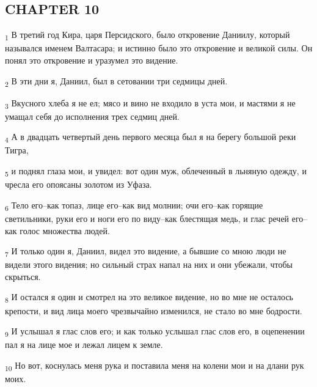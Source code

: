 \subsection{CHAPTER 10}
\begin{tcolorbox}
\textsubscript{1} В третий год Кира, царя Персидского, было откровение Даниилу, который назывался именем Валтасара; и истинно было это откровение и великой силы. Он понял это откровение и уразумел это видение.
\end{tcolorbox}
\begin{tcolorbox}
\textsubscript{2} В эти дни я, Даниил, был в сетовании три седмицы дней.
\end{tcolorbox}
\begin{tcolorbox}
\textsubscript{3} Вкусного хлеба я не ел; мясо и вино не входило в уста мои, и мастями я не умащал себя до исполнения трех седмиц дней.
\end{tcolorbox}
\begin{tcolorbox}
\textsubscript{4} А в двадцать четвертый день первого месяца был я на берегу большой реки Тигра,
\end{tcolorbox}
\begin{tcolorbox}
\textsubscript{5} и поднял глаза мои, и увидел: вот один муж, облеченный в льняную одежду, и чресла его опоясаны золотом из Уфаза.
\end{tcolorbox}
\begin{tcolorbox}
\textsubscript{6} Тело его--как топаз, лице его--как вид молнии; очи его--как горящие светильники, руки его и ноги его по виду--как блестящая медь, и глас речей его--как голос множества людей.
\end{tcolorbox}
\begin{tcolorbox}
\textsubscript{7} И только один я, Даниил, видел это видение, а бывшие со мною люди не видели этого видения; но сильный страх напал на них и они убежали, чтобы скрыться.
\end{tcolorbox}
\begin{tcolorbox}
\textsubscript{8} И остался я один и смотрел на это великое видение, но во мне не осталось крепости, и вид лица моего чрезвычайно изменился, не стало во мне бодрости.
\end{tcolorbox}
\begin{tcolorbox}
\textsubscript{9} И услышал я глас слов его; и как только услышал глас слов его, в оцепенении пал я на лице мое и лежал лицем к земле.
\end{tcolorbox}
\begin{tcolorbox}
\textsubscript{10} Но вот, коснулась меня рука и поставила меня на колени мои и на длани рук моих.
\end{tcolorbox}
